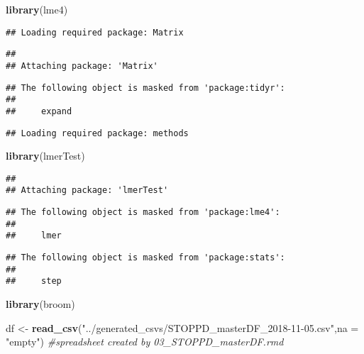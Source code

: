 \documentclass[]{article}
\newenvironment{Shaded}{\begin{snugshade}}{\end{snugshade}}
\newcommand{\KeywordTok}[1]{\textcolor[rgb]{0.13,0.29,0.53}{\textbf{#1}}}
\newcommand{\DataTypeTok}[1]{\textcolor[rgb]{0.13,0.29,0.53}{#1}}
\newcommand{\StringTok}[1]{\textcolor[rgb]{0.31,0.60,0.02}{#1}}
\newcommand{\CommentTok}[1]{\textcolor[rgb]{0.56,0.35,0.01}{\textit{#1}}}
\newcommand{\NormalTok}[1]{#1}
\theoremstyle{definition}
\theoremstyle{definition}
\theoremstyle{definition}
\theoremstyle{remark}
\begin{document}
\begin{Shaded}
\begin{Highlighting}[]
\KeywordTok{library}\NormalTok{(lme4)}
\end{Highlighting}
\end{Shaded}

\begin{verbatim}
## Loading required package: Matrix
\end{verbatim}

\begin{verbatim}
## 
## Attaching package: 'Matrix'
\end{verbatim}

\begin{verbatim}
## The following object is masked from 'package:tidyr':
## 
##     expand
\end{verbatim}

\begin{verbatim}
## Loading required package: methods
\end{verbatim}

\begin{Shaded}
\begin{Highlighting}[]
\KeywordTok{library}\NormalTok{(lmerTest)}
\end{Highlighting}
\end{Shaded}

\begin{verbatim}
## 
## Attaching package: 'lmerTest'
\end{verbatim}

\begin{verbatim}
## The following object is masked from 'package:lme4':
## 
##     lmer
\end{verbatim}

\begin{verbatim}
## The following object is masked from 'package:stats':
## 
##     step
\end{verbatim}

\begin{Shaded}
\begin{Highlighting}[]
\KeywordTok{library}\NormalTok{(broom)}

\NormalTok{df <-}\StringTok{ }\KeywordTok{read_csv}\NormalTok{(}\StringTok{"../generated_csvs/STOPPD_masterDF_2018-11-05.csv"}\NormalTok{,}\DataTypeTok{na =} \StringTok{"empty"}\NormalTok{) }\CommentTok{#spreadsheet created by 03_STOPPD_masterDF.rmd}
\end{Highlighting}
\end{Shaded}
\end{document}
